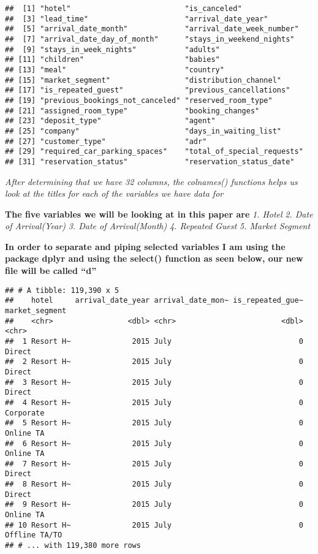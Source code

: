 \documentclass[
]{article}
\begin{document}
\begin{verbatim}
##  [1] "hotel"                          "is_canceled"                   
##  [3] "lead_time"                      "arrival_date_year"             
##  [5] "arrival_date_month"             "arrival_date_week_number"      
##  [7] "arrival_date_day_of_month"      "stays_in_weekend_nights"       
##  [9] "stays_in_week_nights"           "adults"                        
## [11] "children"                       "babies"                        
## [13] "meal"                           "country"                       
## [15] "market_segment"                 "distribution_channel"          
## [17] "is_repeated_guest"              "previous_cancellations"        
## [19] "previous_bookings_not_canceled" "reserved_room_type"            
## [21] "assigned_room_type"             "booking_changes"               
## [23] "deposit_type"                   "agent"                         
## [25] "company"                        "days_in_waiting_list"          
## [27] "customer_type"                  "adr"                           
## [29] "required_car_parking_spaces"    "total_of_special_requests"     
## [31] "reservation_status"             "reservation_status_date"
\end{verbatim}

\emph{After determining that we have 32 columns, the colnames()
functions helps us look at the titles for each of the variables we have
data for}

\textbf{The five variables we will be looking at in this paper are}
\emph{1. Hotel} \emph{2. Date of Arrival(Year)} \emph{3. Date of
Arrival(Month)} \emph{4. Repeated Guest} \emph{5. Market Segment}

\textbf{In order to separate and piping selected variables I am using
the package dplyr and using the select() function as seen below, our new
file will be called ``d''}

\begin{verbatim}
## # A tibble: 119,390 x 5
##    hotel     arrival_date_year arrival_date_mon~ is_repeated_gue~ market_segment
##    <chr>                 <dbl> <chr>                        <dbl> <chr>         
##  1 Resort H~              2015 July                             0 Direct        
##  2 Resort H~              2015 July                             0 Direct        
##  3 Resort H~              2015 July                             0 Direct        
##  4 Resort H~              2015 July                             0 Corporate     
##  5 Resort H~              2015 July                             0 Online TA     
##  6 Resort H~              2015 July                             0 Online TA     
##  7 Resort H~              2015 July                             0 Direct        
##  8 Resort H~              2015 July                             0 Direct        
##  9 Resort H~              2015 July                             0 Online TA     
## 10 Resort H~              2015 July                             0 Offline TA/TO 
## # ... with 119,380 more rows
\end{verbatim}
\end{document}
